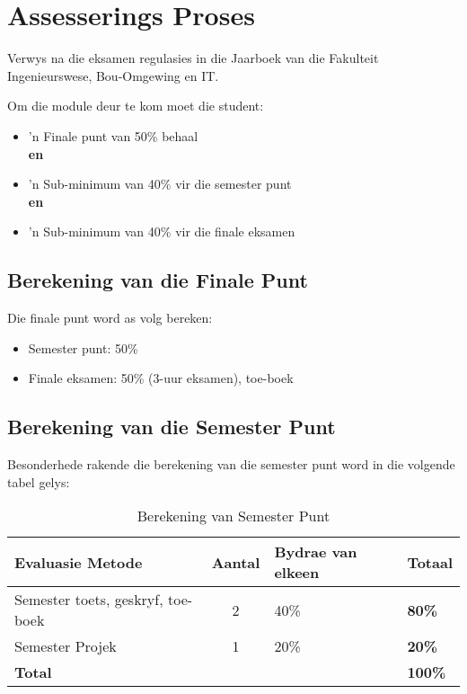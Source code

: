 \section{Assesserings Proses}
    Verwys na die eksamen regulasies in die Jaarboek van die Fakulteit
    Ingenieurswese, Bou-Omgewing en IT.

    Om die module deur te kom moet die student:
    \begin{itemize}
        \item 'n Finale punt van 50\% behaal \\ {\bf en}
        \item 'n Sub-minimum van 40\% vir die semester punt \\ {\bf en}
        \item 'n Sub-minimum van 40\% vir die finale eksamen
    \end{itemize}
    
    \subsection{Berekening van die Finale Punt}
        Die finale punt word as volg bereken:
        \begin{itemize}
            \item Semester punt: 50\%
            \item Finale eksamen: 50\% (3-uur eksamen), toe-boek
        \end{itemize}

    \subsection{Berekening van die Semester Punt}
        Besonderhede rakende die berekening van die semester punt word in die volgende tabel gelys:
        \begin{table}[!h]
            \begin{center}
             \begin{tabular}{|p{5cm}|c|l|l|}
                 \hline
                 {\bf Evaluasie Metode} & {\bf Aantal} & 
                 {\bf Bydrae van elkeen} & {\bf Totaal} \\
                 \hline
                 Semester toets, geskryf, toe-boek 
                    & 2 & 40\% & {\bf 80\%} \\ \hline
                 Semester Projek 
                    & 1 & 20\% & {\bf 20\%} \\
                 \hline
                 \multicolumn{3}{|l|}{{\bf Total}} & {\bf 100\%} \\
                 \hline
             \end{tabular}
             \caption{Berekening van Semester Punt}
            \end{center}
        \end{table}
    
